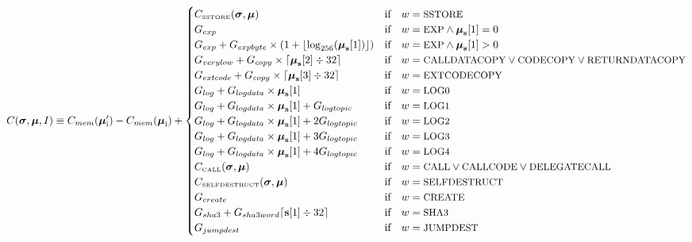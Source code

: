 \documentclass[9pt,oneside]{amsart}
\begin{document}
\begin{equation}
C(\boldsymbol{\sigma}, \boldsymbol{\mu}, I) \equiv C_{mem}(\boldsymbol{\mu}'_{\mathrm{i}})-C_{mem}(\boldsymbol{\mu}_{\mathrm{i}}) + \begin{cases}
C_\text{\tiny SSTORE}(\boldsymbol{\sigma}, \boldsymbol{\mu}) & \text{if} \quad w = \text{\small SSTORE} \\
G_{exp} & \text{if} \quad w = \text{\small EXP} \wedge \boldsymbol{\mu}_{\mathbf{s}}[1] = 0 \\
G_{exp} + G_{expbyte}\times(1+\lfloor\log_{256}(\boldsymbol{\mu}_{\mathbf{s}}[1])\rfloor) & \text{if} \quad w = \text{\small EXP} \wedge \boldsymbol{\mu}_{\mathbf{s}}[1] > 0 \\
G_{verylow} + G_{copy}\times\lceil\boldsymbol{\mu}_{\mathbf{s}}[2] \div 32\rceil & \text{if} \quad w = \text{\small CALLDATACOPY} \lor \text{\small CODECOPY} \lor \text{\small RETURNDATACOPY} \\
G_{extcode} + G_{copy}\times\lceil\boldsymbol{\mu}_{\mathbf{s}}[3] \div 32\rceil & \text{if} \quad w = \text{\small EXTCODECOPY} \\
G_{log}+G_{logdata}\times\boldsymbol{\mu}_{\mathbf{s}}[1] & \text{if} \quad w = \text{\small LOG0} \\
G_{log}+G_{logdata}\times\boldsymbol{\mu}_{\mathbf{s}}[1]+G_{logtopic} & \text{if} \quad w = \text{\small LOG1} \\
G_{log}+G_{logdata}\times\boldsymbol{\mu}_{\mathbf{s}}[1]+2G_{logtopic} & \text{if} \quad w = \text{\small LOG2} \\
G_{log}+G_{logdata}\times\boldsymbol{\mu}_{\mathbf{s}}[1]+3G_{logtopic} & \text{if} \quad w = \text{\small LOG3} \\
G_{log}+G_{logdata}\times\boldsymbol{\mu}_{\mathbf{s}}[1]+4G_{logtopic} & \text{if} \quad w = \text{\small LOG4} \\
C_\text{\tiny CALL}(\boldsymbol{\sigma}, \boldsymbol{\mu}) & \text{if} \quad w = \text{\small CALL} \lor \text{\small CALLCODE} \lor \text{\small DELEGATECALL} \\
C_\text{\tiny SELFDESTRUCT}(\boldsymbol{\sigma}, \boldsymbol{\mu}) & \text{if} \quad w = \text{\small SELFDESTRUCT} \\
G_{create} & \text{if} \quad w = \text{\small CREATE}\\
G_{sha3}+G_{sha3word} \lceil \mathbf{s}[1] \div 32 \rceil & \text{if} \quad w = \text{\small SHA3}\\
G_{jumpdest} & \text{if} \quad w = \text{\small JUMPDEST}\\

\end{cases}
\end{equation}
\end{document}

